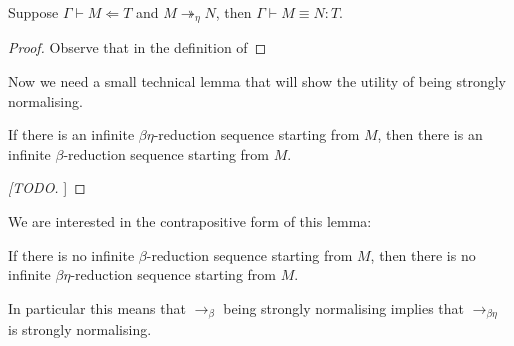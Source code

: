 \begin{comment}
\begin{proof}
    By definition $\partial_{\eta}(r)= \max(\partial(T), \partial(U))+1$ for some types $U$ and $V$ such that $T = U \times V$ or $T = U \to V$. Hence 
\end{proof}


\begin{lemma}
    $\eta$-reduction is weakly normalising.
\end{lemma}

\begin{lemma}
    $\eta$-reduction is strongly normalising.
\end{lemma}
\end{comment}

\begin{lemma}
    Suppose $\Gamma \vdash M \Leftarrow T$ and $M \twoheadrightarrow_{\eta} N$, then $\Gamma \vdash M \equiv N : T$.
\end{lemma}

\begin{proof}
    Observe that in the definition of 
\end{proof}


Now we need a small technical lemma that will show the utility of being strongly normalising.

\begin{lemma}
    If there is an infinite $\beta \eta$-reduction sequence starting from $M$, then there is an infinite $\beta$-reduction sequence starting from $M$.
\end{lemma}

\begin{proof}
    [[TODO]]
\end{proof}

We are interested in the contrapositive form of this lemma:

\begin{cor}
    If there is no infinite $\beta$-reduction sequence starting from $M$, then there is no infinite $\beta \eta$-reduction sequence starting from $M$.
\end{cor}

\begin{remark}
    In particular this means that $\to_{\beta}$ being strongly normalising implies that $\to_{\beta \eta}$ is strongly normalising.
\end{remark}

